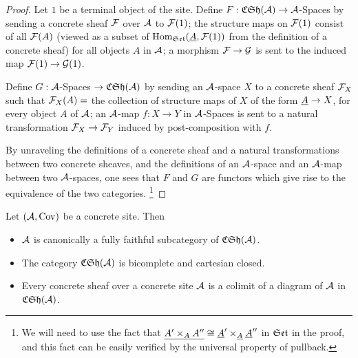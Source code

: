 \begin{proof}
  Let $1$ be a terminal object of the site.
  Define $F:\mathfrak{CSh}(\mathcal{A}) \to \mathcal{A}$-Spaces by sending a concrete sheaf $\mathcal{F}$ over $\mathcal{A}$ to $\mathcal{F}(1)$;
  the structure maps on $\mathcal{F}(1)$ consist of all $\mathcal{F}(A)$ (viewed as a subset of $\mathrm{Hom}_{\mathfrak{Set}}(\underline{A},\mathcal{F}(1))$ from the definition of a concrete sheaf) for all objects $A$ in $\mathcal{A}$;
  a morphism $\mathcal{F} \to \mathcal{G}$ is sent to the induced map $\mathcal{F}(1) \to \mathcal{G}(1)$.

  Define $G:\mathcal{A}$-Spaces $\to \mathfrak{CSh}(\mathcal{A})$ by sending an $\mathcal{A}$-space $X$ to a concrete sheaf $\mathcal{F}_X$ such that $\mathcal{F}_X(A) = $ the collection of structure maps of $X$ of the form $\underline{A} \to X$,
  for every object $A$ of $\mathcal{A}$; an $\mathcal{A}$-map $f:X \to Y$ in $\mathcal{A}$-Spaces is sent to a natural transformation $\mathcal{F}_X \to \mathcal{F}_Y$ induced by post-composition with $f$.

  By unraveling the definitions of a concrete sheaf and a natural transformations between two concrete sheaves,
  and the definitions of an $\mathcal{A}$-space and an $\mathcal{A}$-map between two $\mathcal{A}$-spaces,
  one sees that $F$ and $G$ are functors which give rise to the equivalence of the two categories.%
  \footnote{We will need to use the fact that $\underline{A' \times_A A''} \cong \underline{A}' \times_{\underline{A}} \underline{A}''$ in $\mathfrak{Set}$ in the proof,
  and this fact can be easily verified by the universal property of pullback.}
\end{proof}

\begin{theorem}
  Let $(\mathcal{A},\mathrm{Cov})$ be a concrete site.
  Then
  \begin{itemize}
    \item[*] $\mathcal{A}$ is canonically a fully faithful subcategory of $\mathfrak{CSh}(\mathcal{A})$.
    \item[*] The category $\mathfrak{CSh}(\mathcal{A})$ is bicomplete and cartesian closed.
    \item[*] Every concrete sheaf over a concrete site $\mathcal{A}$ is a colimit of a diagram of $\mathcal{A}$ in $\mathfrak{CSh}(\mathcal{A})$.
  \end{itemize}
\end{theorem}

